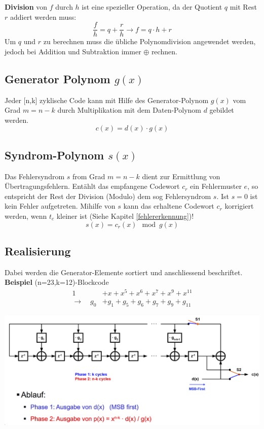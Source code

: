 \textbf{Division}  von $f$ durch $h$ ist eine spezieller Operation, da der Quotient $q$ mit Rest $r$ addiert werden muss:
\[
\frac{f}{h} = q + \frac{r}{h} \xrightarrow{} f = q\cdot h + r
\]
Um $q$ und $r$ zu berechnen muss die übliche Polynomdivision angewendet werden, jedoch bei Addition und Subtraktion immer $\oplus$ rechnen.


\subsection{Generator Polynom $g(x)$}
Jeder [n,k] zyklische Code kann mit Hilfe des Generator-Polynom $g(x)$ vom Grad $m =n-k$ durch Multiplikation mit dem Daten-Polynom $d$ gebildet werden.
\[
c(x) = d(x) \cdot g(x)
\]

\subsection{Syndrom-Polynom $s(x)$}
Das Fehlersyndrom $s$ from Grad $m=n-k$ dient zur Ermittlung von Übertragungsfehlern. Entählt das empfangene Codewort $c_r$ ein Fehlermuster $e$, so entspricht der Rest der Division (Modulo) dem sog Fehlersyndrom $s$. Ist $s=0$ ist kein Fehler aufgetreten. Mihilfe von $s$ kann das erhaltene Codewort $c_r$ korrigiert werden, wenn $t_c$ kleiner ist (Siehe Kapitel \ref{fehlererkennung})!
\[
s(x) = c_r(x) \mod g(x)
\]

\subsection{Realisierung}
Dabei werden die Generator-Elemente sortiert und anschliessend beschriftet. \textbf{Beispiel} (n=23,k=12)-Blockcode
\begin{align*}
	 1 &+ x + x^5 +x^6 + x^7 + x^9 + x^{11}\\
	\rightarrow \quad g_0 &+ g_1 + g_5 + g_6 +g_7 + g_9 + g_{11}
\end{align*}
\begin{center}
	\includegraphics[width=\columnwidth]{Images/realisierung}
\end{center}
